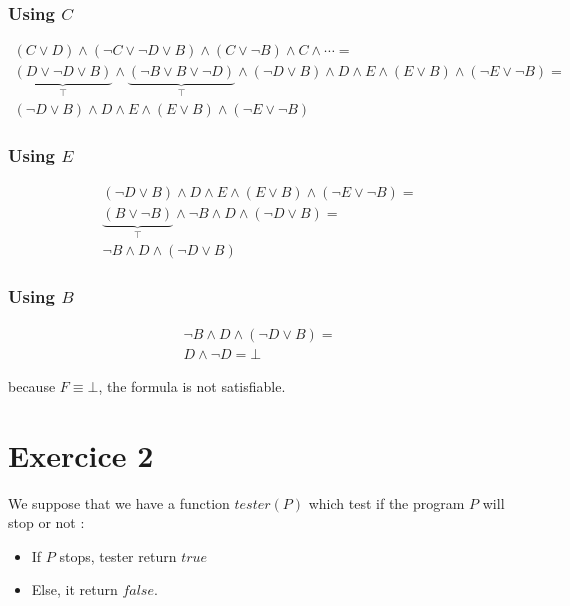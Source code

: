 \documentclass[a4paper,11pt]{report}
\begin{document}
\subsubsection*{Using $C$}

\begin{gather*}
  (C \vee D) \wedge (\neg C \vee \neg D \vee B) \wedge (C \vee \neg B)
  \wedge C \wedge \cdots = \\
  \underbrace{(D \vee \neg D \vee B)}_\top \wedge \underbrace{(\neg B \vee B
    \vee \neg D)}_\top \wedge (\neg D \vee B) \wedge D \wedge E \wedge (E \vee
  B) \wedge (\neg E \vee \neg B) = \\
  (\neg D \vee B) \wedge D \wedge E \wedge (E \vee B) \wedge (\neg E \vee \neg B)
\end{gather*}

\subsubsection*{Using $E$}

\begin{gather*}
  (\neg D \vee B) \wedge D \wedge E \wedge (E \vee B) \wedge (\neg E \vee \neg
  B) = \\
  \underbrace{(B \vee \neg B)}_\top \wedge \neg B \wedge D \wedge (\neg D \vee
  B) = \\
  \neg B \wedge D \wedge (\neg D \vee B)
\end{gather*}

\subsubsection*{Using $B$}

\begin{gather*}
  \neg B \wedge D \wedge (\neg D \vee B) = \\
  D \wedge \neg D = \bot
\end{gather*}

because $F \equiv \bot$, the formula is not satisfiable.

\section*{Exercice 2}

We suppose that we have a function $tester(P)$ which test if the program $P$
will stop or not :
\begin{itemize}
\item If $P$ stops, tester return $true$
\item Else, it return $false$.
\end{itemize}
\end{document}
